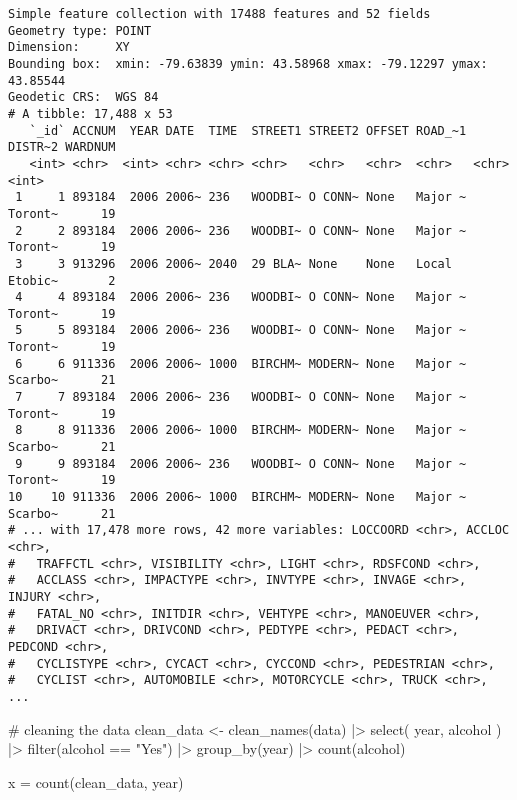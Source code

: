 \documentclass[
  letterpaper,
  DIV=11,
  numbers=noendperiod]{scrartcl}
\newenvironment{Shaded}{\begin{snugshade}}{\end{snugshade}}
\newcommand{\CommentTok}[1]{\textcolor[rgb]{0.37,0.37,0.37}{#1}}
\newcommand{\FunctionTok}[1]{\textcolor[rgb]{0.28,0.35,0.67}{#1}}
\newcommand{\NormalTok}[1]{\textcolor[rgb]{0.00,0.23,0.31}{#1}}
\newcommand{\OtherTok}[1]{\textcolor[rgb]{0.00,0.23,0.31}{#1}}
\newcommand{\SpecialCharTok}[1]{\textcolor[rgb]{0.37,0.37,0.37}{#1}}
\newcommand{\StringTok}[1]{\textcolor[rgb]{0.13,0.47,0.30}{#1}}
\begin{document}
\begin{verbatim}
Simple feature collection with 17488 features and 52 fields
Geometry type: POINT
Dimension:     XY
Bounding box:  xmin: -79.63839 ymin: 43.58968 xmax: -79.12297 ymax: 43.85544
Geodetic CRS:  WGS 84
# A tibble: 17,488 x 53
   `_id` ACCNUM  YEAR DATE  TIME  STREET1 STREET2 OFFSET ROAD_~1 DISTR~2 WARDNUM
   <int> <chr>  <int> <chr> <chr> <chr>   <chr>   <chr>  <chr>   <chr>     <int>
 1     1 893184  2006 2006~ 236   WOODBI~ O CONN~ None   Major ~ Toront~      19
 2     2 893184  2006 2006~ 236   WOODBI~ O CONN~ None   Major ~ Toront~      19
 3     3 913296  2006 2006~ 2040  29 BLA~ None    None   Local   Etobic~       2
 4     4 893184  2006 2006~ 236   WOODBI~ O CONN~ None   Major ~ Toront~      19
 5     5 893184  2006 2006~ 236   WOODBI~ O CONN~ None   Major ~ Toront~      19
 6     6 911336  2006 2006~ 1000  BIRCHM~ MODERN~ None   Major ~ Scarbo~      21
 7     7 893184  2006 2006~ 236   WOODBI~ O CONN~ None   Major ~ Toront~      19
 8     8 911336  2006 2006~ 1000  BIRCHM~ MODERN~ None   Major ~ Scarbo~      21
 9     9 893184  2006 2006~ 236   WOODBI~ O CONN~ None   Major ~ Toront~      19
10    10 911336  2006 2006~ 1000  BIRCHM~ MODERN~ None   Major ~ Scarbo~      21
# ... with 17,478 more rows, 42 more variables: LOCCOORD <chr>, ACCLOC <chr>,
#   TRAFFCTL <chr>, VISIBILITY <chr>, LIGHT <chr>, RDSFCOND <chr>,
#   ACCLASS <chr>, IMPACTYPE <chr>, INVTYPE <chr>, INVAGE <chr>, INJURY <chr>,
#   FATAL_NO <chr>, INITDIR <chr>, VEHTYPE <chr>, MANOEUVER <chr>,
#   DRIVACT <chr>, DRIVCOND <chr>, PEDTYPE <chr>, PEDACT <chr>, PEDCOND <chr>,
#   CYCLISTYPE <chr>, CYCACT <chr>, CYCCOND <chr>, PEDESTRIAN <chr>,
#   CYCLIST <chr>, AUTOMOBILE <chr>, MOTORCYCLE <chr>, TRUCK <chr>, ...
\end{verbatim}

\begin{Shaded}
\begin{Highlighting}[]
\CommentTok{\# cleaning the data}
\NormalTok{clean\_data }\OtherTok{\textless{}{-}}
  \FunctionTok{clean\_names}\NormalTok{(data) }\SpecialCharTok{|\textgreater{}}
  \FunctionTok{select}\NormalTok{(}
\NormalTok{    year, }
\NormalTok{    alcohol}
\NormalTok{    ) }\SpecialCharTok{|\textgreater{}}
  \FunctionTok{filter}\NormalTok{(alcohol }\SpecialCharTok{==} \StringTok{"Yes"}\NormalTok{) }\SpecialCharTok{|\textgreater{}}
  \FunctionTok{group\_by}\NormalTok{(year) }\SpecialCharTok{|\textgreater{}}
  \FunctionTok{count}\NormalTok{(alcohol)}

\NormalTok{x }\OtherTok{=} \FunctionTok{count}\NormalTok{(clean\_data, year)}
\end{Highlighting}
\end{Shaded}
\end{document}

